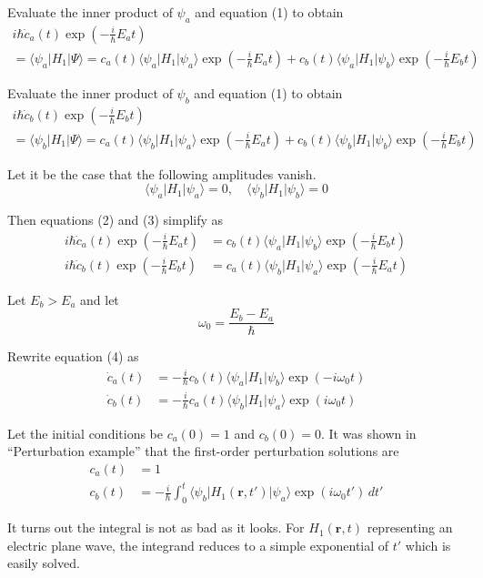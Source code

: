 Evaluate the inner product of $\psi_a$ and equation (1) to obtain
\begin{multline*}
i\hbar\dot c_a(t)\exp\left(-\tfrac{i}{\hbar}E_at\right)
\\
=\langle\psi_a|H_1|\Psi\rangle
=c_a(t)\langle\psi_a|H_1|\psi_a\rangle\exp\left(-\tfrac{i}{\hbar}E_at\right)
+c_b(t)\langle\psi_a|H_1|\psi_b\rangle\exp\left(-\tfrac{i}{\hbar}E_bt\right)
\tag{2}
\end{multline*}

Evaluate the inner product of $\psi_b$ and equation (1) to obtain
\begin{multline*}
i\hbar\dot c_b(t)\exp\left(-\tfrac{i}{\hbar}E_bt\right)
\\
=\langle\psi_b|H_1|\Psi\rangle
=c_a(t)\langle\psi_b|H_1|\psi_a\rangle\exp\left(-\tfrac{i}{\hbar}E_at\right)
+c_b(t)\langle\psi_b|H_1|\psi_b\rangle\exp\left(-\tfrac{i}{\hbar}E_bt\right)
\tag{3}
\end{multline*}

Let it be the case that the following amplitudes vanish.
\begin{equation*}
\langle\psi_a|H_1|\psi_a\rangle=0,\quad \langle\psi_b|H_1|\psi_b\rangle=0
\end{equation*}

Then equations (2) and (3) simplify as
\begin{equation*}
\begin{aligned}
i\hbar\dot c_a(t)\exp\left(-\tfrac{i}{\hbar}E_at\right)
&=c_b(t)\langle\psi_a|H_1|\psi_b\rangle\exp\left(-\tfrac{i}{\hbar}E_bt\right)
\\
i\hbar\dot c_b(t)\exp\left(-\tfrac{i}{\hbar}E_bt\right)
&=c_a(t)\langle\psi_b|H_1|\psi_a\rangle\exp\left(-\tfrac{i}{\hbar}E_at\right)
\end{aligned}
\tag{4}
\end{equation*}

Let $E_b>E_a$ and let
\begin{equation*}
\omega_0=\frac{E_b-E_a}{\hbar}
\end{equation*}

Rewrite equation (4) as
\begin{align*}
\dot c_a(t)&=-\frac{i}{\hbar}c_b(t)\langle\psi_a|H_1|\psi_b\rangle\exp(-i\omega_0t)
\\
\dot c_b(t)&=-\frac{i}{\hbar}c_a(t)\langle\psi_b|H_1|\psi_a\rangle\exp(i\omega_0t)
\end{align*}

Let the initial conditions be $c_a(0)=1$ and $c_b(0)=0$.
It was shown in ``Perturbation example'' that the first-order perturbation solutions are
\begin{align*}
c_a(t)&=1
\\
c_b(t)&=-\frac{i}{\hbar}\int_0^t
\langle\psi_b|H_1(\mathbf r,t')|\psi_a\rangle\exp(i\omega_0t')\,dt'
\end{align*}

It turns out the integral is not as bad as it looks.
For $H_1(\mathbf r,t)$ representing an electric plane wave,
the integrand reduces to a simple exponential of $t'$ which is easily solved.



